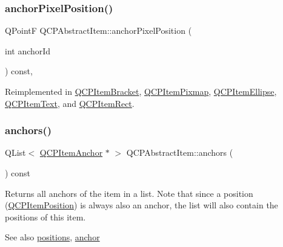 \subsubsection{\texorpdfstring{anchor\+Pixel\+Position()}{anchorPixelPosition()}}
{\footnotesize\ttfamily Q\+PointF Q\+C\+P\+Abstract\+Item\+::anchor\+Pixel\+Position (\begin{DoxyParamCaption}\item[{int}]{anchor\+Id }\end{DoxyParamCaption}) const\hspace{0.3cm}{\ttfamily [protected]}, {\ttfamily [virtual]}}



Reimplemented in \hyperlink{class_q_c_p_item_bracket_a008d87325d26b6616d368cec06027cce}{Q\+C\+P\+Item\+Bracket}, \hyperlink{class_q_c_p_item_pixmap_a5803d8e173bc4d48619fc43701db32e5}{Q\+C\+P\+Item\+Pixmap}, \hyperlink{class_q_c_p_item_ellipse_a35cd6983c61a16ac33c23f08dd2817cc}{Q\+C\+P\+Item\+Ellipse}, \hyperlink{class_q_c_p_item_text_afcdb1724d88d561f65da95fb54b0acb7}{Q\+C\+P\+Item\+Text}, and \hyperlink{class_q_c_p_item_rect_a844027325b33a3b7eef424128ee5109c}{Q\+C\+P\+Item\+Rect}.

\mbox{\label{class_q_c_p_abstract_item_a81d1ecfea3368b836cf9675a0045e659}} 
\subsubsection{\texorpdfstring{anchors()}{anchors()}}
{\footnotesize\ttfamily Q\+List$<$ \hyperlink{class_q_c_p_item_anchor}{Q\+C\+P\+Item\+Anchor} $\ast$ $>$ Q\+C\+P\+Abstract\+Item\+::anchors (\begin{DoxyParamCaption}{ }\end{DoxyParamCaption}) const\hspace{0.3cm}{\ttfamily [inline]}}

Returns all anchors of the item in a list. Note that since a position (\hyperlink{class_q_c_p_item_position}{Q\+C\+P\+Item\+Position}) is always also an anchor, the list will also contain the positions of this item.

\begin{DoxySeeAlso}{See also}
\hyperlink{class_q_c_p_abstract_item_a709f655ac3f7f22d452714134662b454}{positions}, \hyperlink{class_q_c_p_abstract_item_a139c255ea8831642fac91748e29a5adb}{anchor} 
\end{DoxySeeAlso}
\mbox{\label{class_q_c_p_abstract_item_a5579ce9ec7cad202499886b042448b10}} 
